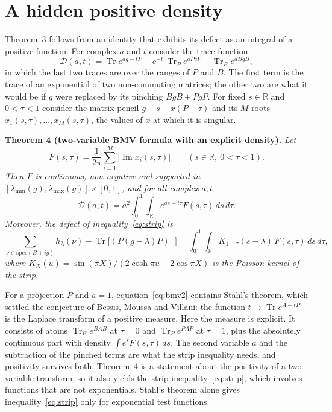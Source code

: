 \documentclass[11pt]{article}
\newcommand{\Tr}{\operatorname{Tr}}
\newcommand{\R}{\mathbb{R}}
\renewcommand{\Im}{\operatorname{Im}}
\begin{document}
\section*{A hidden positive density}

Theorem~3 follows from an identity that exhibits its defect as an integral of a positive function. For complex $a$ and
$t$ consider the trace function
\begin{equation}\label{eq:D}
\mathcal{D}(a,t)=\Tr e^{ag-tP}-e^{-t}\,\Tr_P e^{aPgP}-\Tr_B e^{aBgB},
\end{equation}
in which the last two traces are over the ranges of $P$ and $B$. The first term is the trace of an exponential of two
non-commuting matrices; the other two are what it would be if $g$ were replaced by its pinching $BgB+PgP$. For fixed
$s\in\R$ and $0<\tau<1$ consider the matrix pencil $g-s-x(P-\tau)$ and its $M$ roots $x_1(s,\tau),\dots,x_M(s,\tau)$,
the values of $x$ at which it is singular.

\medskip
\noindent\textbf{Theorem 4 (two-variable BMV formula with an explicit density).} \emph{Let
\begin{equation}\label{eq:F}
F(s,\tau)=\frac{1}{2\pi}\sum_{i=1}^M\bigl|\Im x_i(s,\tau)\bigr|\qquad(s\in\R,\ 0<\tau<1).
\end{equation}
Then $F$ is continuous, non-negative and supported in $[\lambda_{\min}(g),\lambda_{\max}(g)]\times[0,1]$, and for all
complex $a,t$
\begin{equation}\label{eq:bmv2}
\mathcal{D}(a,t)=a^2\int_0^1\!\!\int_{\R}e^{as-t\tau}F(s,\tau)\,ds\,d\tau .
\end{equation}
Moreover, the defect of inequality~\eqref{eq:strip} is
\begin{equation}\label{eq:defect}
\sum_{\nu\in\mathrm{spec}(B+ig)}h_\lambda(\nu)-\Tr\bigl[(P(g-\lambda)P)_+\bigr]
=\int_0^1\!\!\int_\R K_{1-\tau}(s-\lambda)\,F(s,\tau)\,ds\,d\tau,
\end{equation}
where $K_X(u)=\sin(\pi X)/(2\cosh\pi u-2\cos\pi X)$ is the Poisson kernel of the strip.}
\medskip

\noindent For a projection $P$ and $a=1$, equation~\eqref{eq:bmv2} contains Stahl's theorem\cite{Stahl2013,Eremenko2015},
which settled the conjecture of Bessis, Moussa and Villani\cite{BMV1975,LiebSeiringer2004}: the function
$t\mapsto\Tr e^{A-tP}$ is the Laplace transform of a positive measure. Here the measure is explicit. It consists of
atoms $\Tr_Be^{BAB}$ at $\tau=0$ and $\Tr_Pe^{PAP}$ at $\tau=1$, plus the absolutely continuous part with density
$\int e^sF(s,\tau)\,ds$. The second variable $a$ and the subtraction of the pinched terms are what the strip inequality
needs, and positivity survives both. Theorem~4 is a statement about the positivity of a two-variable transform, so it
also yields the strip inequality~\eqref{eq:strip}, which involves functions that are not exponentials. Stahl's theorem
alone gives inequality~\eqref{eq:strip} only for exponential test functions.
\end{document}
